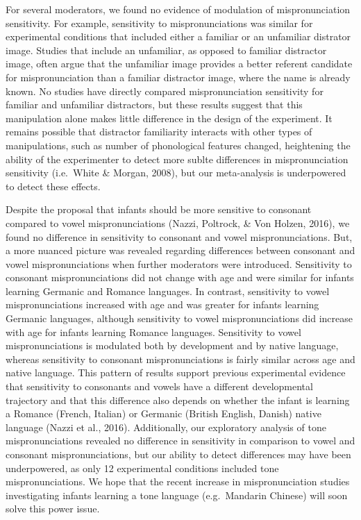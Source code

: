 \documentclass[man]{apa6}
\theoremstyle{definition}
\theoremstyle{definition}
\theoremstyle{definition}
\theoremstyle{remark}
\begin{document}
For several moderators, we found no evidence of modulation of
mispronunciation sensitivity. For example, sensitivity to
mispronunciations was similar for experimental conditions that included
either a familiar or an unfamiliar distrator image. Studies that include
an unfamiliar, as opposed to familiar distractor image, often argue that
the unfamiliar image provides a better referent candidate for
mispronunciation than a familiar distractor image, where the name is
already known. No studies have directly compared mispronunciation
sensitivity for familiar and unfamiliar distractors, but these results
suggest that this manipulation alone makes little difference in the
design of the experiment. It remains possible that distractor
familiarity interacts with other types of manipulations, such as number
of phonological features changed, heightening the ability of the
experimenter to detect more sublte differences in mispronunciation
sensitivity (i.e.~White \& Morgan, 2008), but our meta-analysis is
underpowered to detect these effects.

Despite the proposal that infants should be more sensitive to consonant
compared to vowel mispronunciations (Nazzi, Poltrock, \& Von Holzen,
2016), we found no difference in sensitivity to consonant and vowel
mispronunciations. But, a more nuanced picture was revealed regarding
differences between consonant and vowel mispronunciations when further
moderators were introduced. Sensitivity to consonant mispronunciations
did not change with age and were similar for infants learning Germanic
and Romance languages. In contrast, sensitivity to vowel
mispronunciations increased with age and was greater for infants
learning Germanic languages, although sensitivity to vowel
mispronunciations did increase with age for infants learning Romance
languages. Sensitivity to vowel mispronunciations is modulated both by
development and by native language, whereas sensitivity to consonant
mispronunciations is fairly similar across age and native language. This
pattern of results support previous experimental evidence that
sensitivity to consonants and vowels have a different developmental
trajectory and that this difference also depends on whether the infant
is learning a Romance (French, Italian) or Germanic (British English,
Danish) native language (Nazzi et al., 2016). Additionally, our
exploratory analysis of tone mispronunciations revealed no difference in
sensitivity in comparison to vowel and consonant mispronunciations, but
our ability to detect differences may have been underpowered, as only 12
experimental conditions included tone mispronunciations. We hope that
the recent increase in mispronunciation studies investigating infants
learning a tone language (e.g.~Mandarin Chinese) will soon solve this
power issue.
\end{document}
